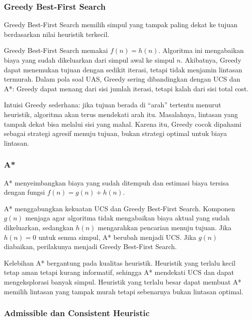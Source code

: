 \subsubsection{Greedy Best-First Search}

\begin{jawab}
Greedy Best-First Search memilih simpul yang tampak paling dekat ke tujuan berdasarkan nilai heuristik terkecil.
\end{jawab}

Greedy Best-First Search memakai $f(n)=h(n)$. Algoritma ini mengabaikan biaya yang sudah dikeluarkan dari simpul awal ke simpul $n$. Akibatnya, Greedy dapat menemukan tujuan dengan sedikit iterasi, tetapi tidak menjamin lintasan termurah. Dalam pola soal UAS, Greedy sering dibandingkan dengan UCS dan A*: Greedy dapat menang dari sisi jumlah iterasi, tetapi kalah dari sisi total cost.

Intuisi Greedy sederhana: jika tujuan berada di ``arah'' tertentu menurut heuristik, algoritma akan terus mendekati arah itu. Masalahnya, lintasan yang tampak dekat bisa melalui sisi yang mahal. Karena itu, Greedy cocok dipahami sebagai strategi agresif menuju tujuan, bukan strategi optimal untuk biaya lintasan.

\subsubsection{A*}

\begin{jawab}
A* menyeimbangkan biaya yang sudah ditempuh dan estimasi biaya tersisa dengan fungsi $f(n)=g(n)+h(n)$.
\end{jawab}

A* menggabungkan kekuatan UCS dan Greedy Best-First Search. Komponen $g(n)$ menjaga agar algoritma tidak mengabaikan biaya aktual yang sudah dikeluarkan, sedangkan $h(n)$ mengarahkan pencarian menuju tujuan. Jika $h(n)=0$ untuk semua simpul, A* berubah menjadi UCS. Jika $g(n)$ diabaikan, perilakunya menjadi Greedy Best-First Search.

Kelebihan A* bergantung pada kualitas heuristik. Heuristik yang terlalu kecil tetap aman tetapi kurang informatif, sehingga A* mendekati UCS dan dapat mengeksplorasi banyak simpul. Heuristik yang terlalu besar dapat membuat A* memilih lintasan yang tampak murah tetapi sebenarnya bukan lintasan optimal.

\subsubsection{Admissible dan Consistent Heuristic}

